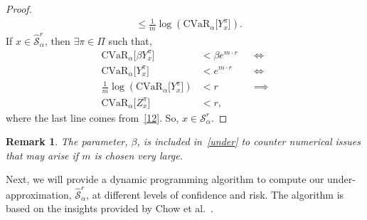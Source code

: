 \documentclass[letterpaper, 10 pt, conference]{ieeeconf}  %
\newtheorem{remark}{Remark}
\begin{document}
\begin{proof}
\begin{equation}
\begin{aligned}
& \leq \frac{1}{m} \log \left(\text{CVaR}_\alpha\big[ Y_x^\pi \big] \right).
\end{aligned}\label{12}\end{equation}
If $x \in \hat{\mathcal{S}}_\alpha^r$, then $\exists \pi \in \Pi$ such that,\footnotemark
\begin{equation*}\begin{aligned}
\text{CVaR}_\alpha \big[ \beta Y_x^\pi \big] & < \beta e^{m\cdot r} && \iff \\
\text{CVaR}_\alpha \big[ Y_x^\pi \big] & < e^{m\cdot r} && \iff \\
\frac{1}{m}\log \left( \text{CVaR}_\alpha \big[ Y_x^\pi \big] \right) & < r && \implies \\
\text{CVaR}_\alpha\big[ Z_x^\pi \big] & < r,
\end{aligned}\end{equation*}
where the last line comes from~\eqref{12}. So, $x \in \mathcal{S}_\alpha^r$.
\end{proof}
\begin{remark}
The parameter, $\beta$, is included in~\eqref{under} to counter numerical issues that may arise if $m$ is chosen very large.
\end{remark}

Next, we will provide a dynamic programming algorithm to compute our under-approximation, $\hat{\mathcal{S}}_\alpha^r$,
at different levels of confidence and risk. The algorithm is based on the insights provided by Chow et al.~\cite{chow2015risk}.
\end{document}

